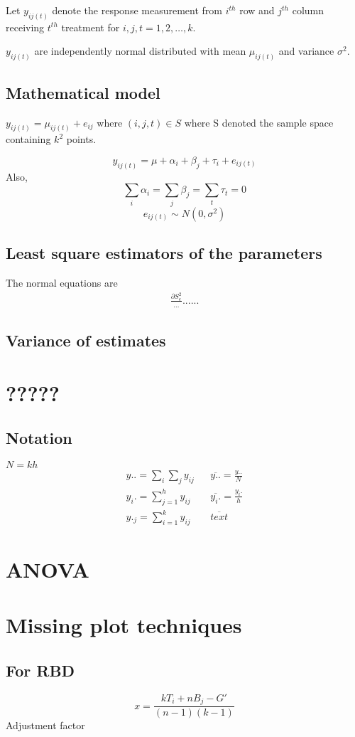 \documentclass[oneside,11pt,pdftex]{book}%
\numberwithin{equation}{section}
\numberwithin{section}{chapter}
\numberwithin{equation}{chapter}
\begin{document}
Let $ y_{ij(t)} $ denote the response measurement from $ i^{th} $ row and $ j^{th} $ column receiving $ t^{th} $ treatment for $ i,j,t=1,2,\dots,k $.

$ y_{ij(t)} $ are independently normal distributed with mean $ \mu_{ij(t)} $ and variance $ \sigma^2 $.

\subsection{Mathematical model}
$ y_{ij(t)}=\mu_{ij(t)}+e_{ij} $ where $ (i,j,t)\in S $ where S denoted the sample space containing $ k^2 $ points.

\[ y_{ij(t)}=\mu+\alpha_i+\beta_j+\tau_i+e_{ij(t)} \]
Also,
\[ \sum_i \alpha_i=\sum_j \beta_j=\sum_t \tau_t=0 \]
$$ e_{ij(t)} \sim N(0,\sigma^2) $$
\subsection{Least square estimators of the parameters}
The normal equations are 
\begin{align*}
	\frac{\partial S^2_e}{...}...
	...
\end{align*}

\subsection{Variance of estimates}

\section{?????}
\subsection{Notation}
$ N=kh $
\begin{align*}
	y..=\sum_i \sum_j y_{ij} && \overline{y..}=\frac{y..}{N}\\
	y_i.=\sum_{j=1}^h y_{ij} && \overline{y_i.}=\frac{y_i.}{h}\\
	y._j=\sum_{i=1}^k y_{ij} && \overline{text} 
\end{align*}

\section{ANOVA}

\section{Missing plot techniques}

\subsection{For RBD}
\[ x=\frac{kT_i+nB_j-G'}{(n-1)(k-1)} \]
Adjustment factor
\backmatter
\thispagestyle{empty}
\newpage
\end{document}
